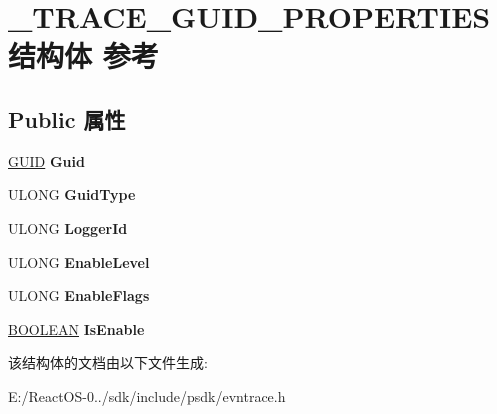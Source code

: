 \hypertarget{struct___t_r_a_c_e___g_u_i_d___p_r_o_p_e_r_t_i_e_s}{}\section{\+\_\+\+T\+R\+A\+C\+E\+\_\+\+G\+U\+I\+D\+\_\+\+P\+R\+O\+P\+E\+R\+T\+I\+E\+S结构体 参考}
\label{struct___t_r_a_c_e___g_u_i_d___p_r_o_p_e_r_t_i_e_s}
\subsection*{Public 属性}
\begin{DoxyCompactItemize}
\item 
\mbox{\label{struct___t_r_a_c_e___g_u_i_d___p_r_o_p_e_r_t_i_e_s_afac10b0aa70ca4c3f0a7c5aafb03c8c9}} 
\hyperlink{interface_g_u_i_d}{G\+U\+ID} {\bfseries Guid}
\item 
\mbox{\label{struct___t_r_a_c_e___g_u_i_d___p_r_o_p_e_r_t_i_e_s_aa74094b8957c64e39bebc74118c9195e}} 
U\+L\+O\+NG {\bfseries Guid\+Type}
\item 
\mbox{\label{struct___t_r_a_c_e___g_u_i_d___p_r_o_p_e_r_t_i_e_s_a5eaa9c37661211a25853bdee82022176}} 
U\+L\+O\+NG {\bfseries Logger\+Id}
\item 
\mbox{\label{struct___t_r_a_c_e___g_u_i_d___p_r_o_p_e_r_t_i_e_s_a4071ec6b25b96b7451735e73470dde05}} 
U\+L\+O\+NG {\bfseries Enable\+Level}
\item 
\mbox{\label{struct___t_r_a_c_e___g_u_i_d___p_r_o_p_e_r_t_i_e_s_a0eebbdbc0393d788ec9edea886b4d257}} 
U\+L\+O\+NG {\bfseries Enable\+Flags}
\item 
\mbox{\label{struct___t_r_a_c_e___g_u_i_d___p_r_o_p_e_r_t_i_e_s_a053272c50c2ea7d984390187ee0f453f}} 
\hyperlink{_processor_bind_8h_a112e3146cb38b6ee95e64d85842e380a}{B\+O\+O\+L\+E\+AN} {\bfseries Is\+Enable}
\end{DoxyCompactItemize}


该结构体的文档由以下文件生成\+:\begin{DoxyCompactItemize}
\item 
E\+:/\+React\+O\+S-\/0../sdk/include/psdk/evntrace.\+h\end{DoxyCompactItemize}
